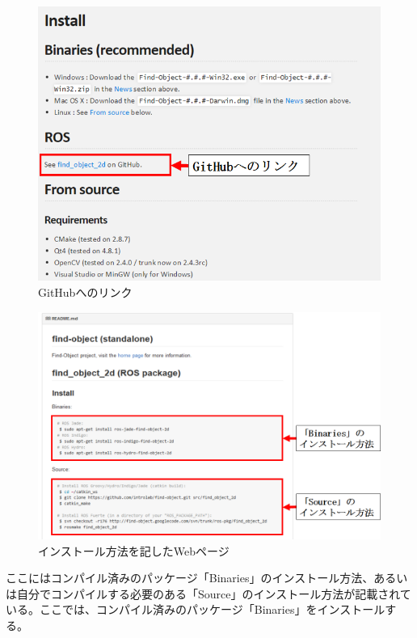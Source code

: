 \begin{figure}[htp]
  \centering
  \includegraphics[width=\columnwidth]{pictures/chapter7/pic_07_07.png}
  \caption{GitHubへのリンク}
\end{figure}

\begin{figure}[htp]
  \centering
  \includegraphics[width=\columnwidth]{pictures/chapter7/pic_07_08.png}
  \caption{インストール方法を記したWebページ}
\end{figure}

ここにはコンパイル済みのパッケージ「Binaries」のインストール方法、あるいは自分でコンパイルする必要のある「Source」のインストール方法が記載されている。ここでは、コンパイル済みのパッケージ「Binaries」をインストールする。

